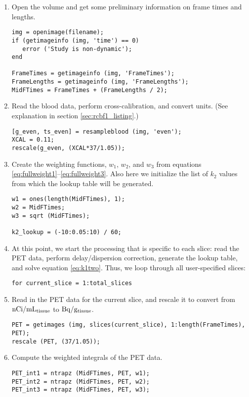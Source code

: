 \begin{enumerate}
\item Open the volume and get some preliminary information on frame
  times and lengths.
  \begin{verbatim}
img = openimage(filename);
if (getimageinfo (img, 'time') == 0)
   error ('Study is non-dynamic');
end

FrameTimes = getimageinfo (img, 'FrameTimes');
FrameLengths = getimageinfo (img, 'FrameLengths');
MidFTimes = FrameTimes + (FrameLengths / 2);
  \end{verbatim}

\item Read the blood data, perform cross-calibration, and convert
  units.  (See explanation in section \ref{sec:rcbf1_listing}.)
  \begin{verbatim}
[g_even, ts_even] = resampleblood (img, 'even');
XCAL = 0.11;
rescale(g_even, (XCAL*37/1.05));
  \end{verbatim}

\item Create the weighting functions, $w_1$, $w_2$, and $w_3$ from
  equations \ref{eq:fullweight1}--\ref{eq:fullweight3}.  Also here we
  initialize the list of $k_2$ values from which the lookup table will
  be generated.

  \begin{verbatim}
w1 = ones(length(MidFTimes), 1);
w2 = MidFTimes;
w3 = sqrt (MidFTimes);

k2_lookup = (-10:0.05:10) / 60;
  \end{verbatim}


\item At this point, we start the processing that is specific to each
  slice: read the PET data, perform delay/dispersion correction,
  generate the lookup table, and solve equation \ref{eq:k1two}.  Thus,
  we loop through all user-specified slices:
  \begin{verbatim}
for current_slice = 1:total_slices
  \end{verbatim}

\item Read in the PET data for the current slice, and rescale it
  to convert from ${\rm nCi/mL_{tissue}}$ to ${\rm Bq/g_{tissue}}$.
  \begin{verbatim}
PET = getimages (img, slices(current_slice), 1:length(FrameTimes), PET);
rescale (PET, (37/1.05));
  \end{verbatim}

\item Compute the weighted integrals of the PET data.
  \begin{verbatim}
PET_int1 = ntrapz (MidFTimes, PET, w1);
PET_int2 = ntrapz (MidFTimes, PET, w2);
PET_int3 = ntrapz (MidFTimes, PET, w3);
  \end{verbatim}


\end{enumerate}
